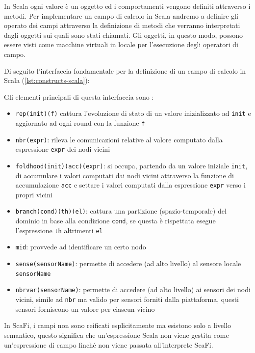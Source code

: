 \documentclass[12pt,a4paper,openright,twoside]{book}
\begin{document}
In Scala ogni valore è un oggetto ed i comportamenti vengono definiti attraverso i metodi. Per implementare un campo di calcolo in Scala andremo a definire gli operato dei campi attraverso la definizione di metodi che verranno interpretati dagli oggetti sui quali sono stati chiamati. Gli oggetti, in questo modo, possono essere visti come macchine virtuali in locale per l'esecuzione degli operatori di campo.

Di seguito l'interfaccia fondamentale per la definizione di un campo di calcolo in Scala (\cref{lst:constructs-scala}):



Gli elementi principali di questa interfaccia sono \cite{Casadei2022}:
\begin{itemize}
    \item \verb|rep(init)(f)| cattura l'evoluzione di stato di un valore inizializzato ad \verb|init| e aggiornato ad ogni round con la funzione \verb|f|
    \item \verb|nbr(expr)|: rileva le comunicazioni relative al valore computato dalla espressione \verb|expr| dei nodi vicini
    \item \verb|foldhood(init)(acc)(expr)|: si occupa, partendo da un valore iniziale \verb|init|, di accumulare i valori computati dai nodi vicini attraverso la funzione di accumulazione \verb|acc| e settare i valori computati dalla espressione \verb|expr| verso i propri vicini
    \item \verb|branch(cond)(th)(el)|: cattura una partizione (spazio-temporale) del dominio in base alla condizione \verb|cond|, se questa è rispettata esegue l'espressione \verb|th| altrimenti \verb|el|
    \item \verb|mid|: provvede ad identificare un certo nodo
    \item \verb|sense(sensorName)|: permette di accedere (ad alto livello) al sensore locale \verb|sensorName|
    \item \verb|nbrvar(sensorName)|: permette di accedere (ad alto livello) ai sensori dei nodi vicini, simile ad \verb|nbr| ma valido per sensori forniti dalla piattaforma, questi sensori forniscono un valore per ciascun vicino
\end{itemize}

In ScaFi, i campi non sono reificati esplicitamente ma esistono solo a livello semantico, questo significa che un'espressione Scala non viene gestita come un'espressione di campo finché non viene passata all'interprete ScaFi.
\end{document}
